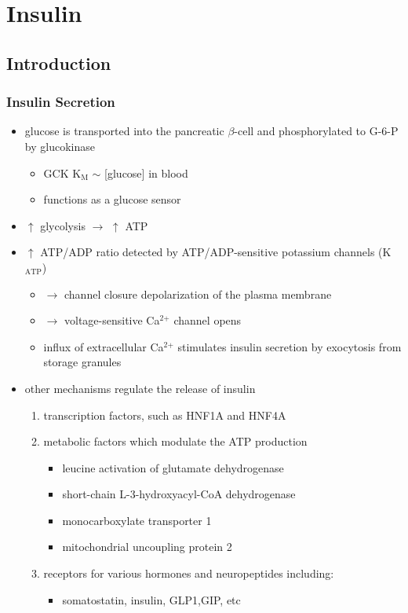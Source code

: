 \documentclass{scrartcl}
\begin{document}
\section{Insulin}
\label{sec:org371c768}
\subsection{Introduction}
\label{sec:orgb065dbe}
\subsubsection{Insulin Secretion}
\label{sec:orge8cd327}
\begin{itemize}
\item glucose is transported into the pancreatic \(\beta\)-cell and phosphorylated to G-6-P by glucokinase
\begin{itemize}
\item GCK K\(_{\text{M}}\) \(\sim\) [glucose] in blood
\item functions as a glucose sensor
\end{itemize}
\item \(\uparrow\) glycolysis \(\to\) \(\uparrow\) ATP
\item \(\uparrow\) ATP/ADP ratio detected by ATP/ADP-sensitive potassium channels (K\(_{\text{ATP}}\))
\begin{itemize}
\item \(\to\) channel closure depolarization of the plasma membrane
\item \(\to\) voltage-sensitive Ca\(^{\text{2+}}\) channel opens
\item influx of extracellular Ca\(^{\text{2+}}\) stimulates insulin secretion by
exocytosis from storage granules
\end{itemize}

\item other mechanisms regulate the release of insulin
\begin{enumerate}
\item transcription factors, such as HNF1A and HNF4A
\item metabolic factors which modulate the ATP production
\begin{itemize}
\item leucine activation of glutamate dehydrogenase
\item short-chain L-3-hydroxyacyl-CoA dehydrogenase
\item monocarboxylate transporter 1
\item mitochondrial uncoupling protein 2
\end{itemize}
\item receptors for various hormones and neuropeptides including:
\begin{itemize}
\item somatostatin, insulin, GLP1,GIP, etc
\end{itemize}
\end{enumerate}
\end{itemize}
\end{document}
